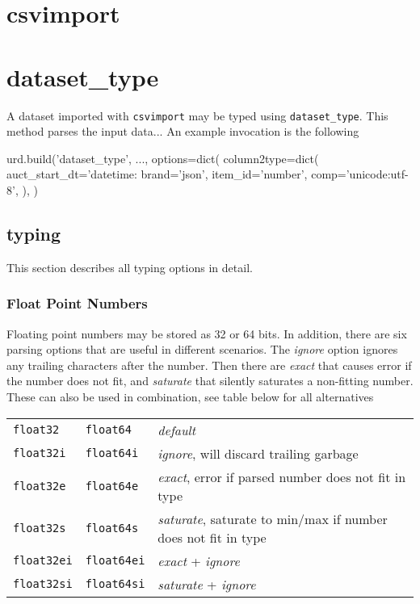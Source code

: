 \section{csvimport}




\clearpage
\section{dataset\_type}

A dataset imported with \texttt{csvimport} may be typed using
\texttt{dataset\_type}.  This method parses the input data...
An example invocation is the following

\begin{python}
urd.build('dataset_type', ...,
  options=dict(
    column2type=dict(
      auct_start_dt='datetime:%
      brand='json',
      item_id='number',
      comp='unicode:utf-8',
    ),
  )
\end{python}


\subsection{typing}
This section describes all typing options in detail.

\subsubsection{Float Point Numbers}
Floating point numbers may be stored as 32 or 64 bits.  In addition,
there are six parsing options that are useful in different scenarios.
The \emph{ignore} option ignores any trailing characters after the
number.  Then there are \emph{exact} that causes error if the number
does not fit, and \emph{saturate} that silently saturates a
non-fitting number.  These can also be used in combination, see table
below for all alternatives\\

\begin{tabular}{lll}
\texttt{float32} & \texttt{float64} & \emph{default}\\
\texttt{float32i} & \texttt{float64i} & \emph{ignore}, will discard trailing garbage\\
\texttt{float32e} & \texttt{float64e} & \emph{exact}, error if parsed number does not fit in type \\
\texttt{float32s} & \texttt{float64s} & \emph{saturate}, saturate to min/max if number does not fit in type \\
\texttt{float32ei} & \texttt{float64ei} & \emph{exact} + \emph{ignore} \\
\texttt{float32si} & \texttt{float64si} & \emph{saturate} + \emph{ignore} \\
\end{tabular}

